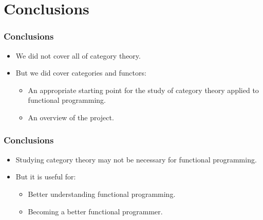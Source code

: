 \documentclass{beamer}
\begin{document}

\section{Conclusions}


\begin{frame}
  \frametitle{Conclusions}

  \begin{itemize}
  \item
    We did not cover all of category theory.
  \end{itemize}
  \begin{itemize}
  \item
    But we did cover categories and functors:
    \begin{itemize}
    \item
      An appropriate starting point for the study of category theory
      applied to functional programming.
    \item
      An overview of the project.
    \end{itemize}
  \end{itemize}

\end{frame}


\begin{frame}
  \frametitle{Conclusions}

  \begin{itemize}
  \item
    Studying category theory may not be necessary for functional
    programming.
  \end{itemize}
  \begin{itemize}
  \item
    But it is useful for:
    \begin{itemize}
    \item
      Better understanding functional programming.
    \item
      Becoming a better functional programmer.
    \end{itemize}
  \end{itemize}

\end{frame}
\end{document}
